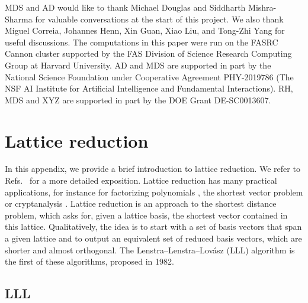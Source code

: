 \documentclass[a4paper,11pt]{article}
\begin{document}
\acknowledgments

MDS and AD would like to thank Michael Douglas and Siddharth Mishra-Sharma for valuable conversations at the start of this project. We also thank Miguel Correia, Johannes Henn, Xin Guan, Xiao Liu, and Tong-Zhi Yang for useful discussions.
The computations in this paper were run on the FASRC Cannon cluster supported by the FAS Division of Science Research Computing Group at Harvard University. AD and MDS are supported in part by the National Science Foundation under Cooperative Agreement PHY-2019786 (The NSF AI Institute for Artificial Intelligence and Fundamental Interactions). RH, MDS and XYZ are supported in part by the DOE Grant DE-SC0013607.



\appendix
\section{Lattice reduction }\label{app:lll_details}
In this appendix, we provide a brief introduction to  lattice reduction.  We refer to Refs.~\cite{Nguyen:2009b,Simon:2010} for a more detailed exposition.
Lattice reduction has many practical applications, for instance for factorizing polynomials \cite{Lenstra:1982}, the shortest vector problem \cite{Fincke:1985} or cryptanalysis \cite{Nguyen:2001}.
  Lattice reduction is an approach to the shortest distance problem, which asks for, given a lattice basis, the shortest vector contained in this lattice. Qualitatively, the idea is to start with a set of basis vectors that span a given lattice and to output an equivalent set of reduced basis vectors, which are shorter and almost orthogonal. The Lenstra–Lenstra–Lov\'asz (LLL) algorithm \cite{Lenstra:1982} is the first of these algorithms, proposed in 1982.


\subsection{LLL}
\end{document}
